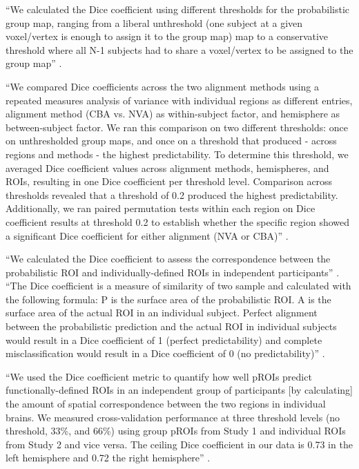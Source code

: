 %
``We calculated the Dice coefficient using different thresholds for the
probabilistic group map, ranging from a liberal unthreshold (one subject at a
given voxel/vertex is enough to assign it to the group map) map to a
conservative threshold where all N-1 subjects had to share a voxel/vertex to be
assigned to the group map'' \citet{rosenke2021probabilistic}.

%
``We compared Dice coefficients across the two alignment methods using a
repeated measures analysis of variance with individual regions as different
entries, alignment method (CBA vs. NVA) as within-subject factor, and hemisphere
as between-subject factor.
%
We ran this comparison on two different thresholds:
%
once on unthresholded group maps, and once on a threshold that produced - across
regions and methods - the highest predictability.
%
To determine this threshold, we averaged Dice coefficient values across
alignment methods, hemispheres, and ROIs, resulting in one Dice coefficient per
threshold level.
%
Comparison across thresholds revealed that a threshold of 0.2 produced the
highest predictability.
%
Additionally, we ran paired permutation tests within each region on Dice
coefficient results at threshold 0.2 to establish whether the specific region
showed a significant Dice coefficient for either alignment (NVA or CBA)''
\citep{rosenke2021probabilistic}.


%
``We calculated the Dice coefficient to assess the correspondence between the
probabilistic ROI and individually-defined ROIs in independent participants''
\citep{weiner2018defining}.
%
``The Dice coefficient is a measure of similarity of two sample and calculated
with the following formula:
%
P is the surface area of the probabilistic ROI.
%
A is the surface area of the actual ROI in an individual subject.
%
Perfect alignment between the probabilistic prediction and the actual ROI in
individual subjects would result in a Dice coefficient of 1 (perfect
predictability) and complete misclassification would result in a Dice
coefficient of 0 (no predictability)'' \citep{weiner2018defining}.

%
``We used the Dice coefficient metric to quantify how well pROIs predict
functionally-defined ROIs in an independent group of participants [by
calculating] the amount of spatial correspondence between the two regions in
individual brains.
%
We measured cross-validation performance at three threshold levels (no
threshold, 33\%, and 66\%) using group pROIs from Study 1 and individual ROIs
from Study 2 and vice versa.
%
The ceiling Dice coefficient in our data is 0.73 in the left hemisphere and 0.72
the right hemisphere'' \citep{weiner2018defining}.

